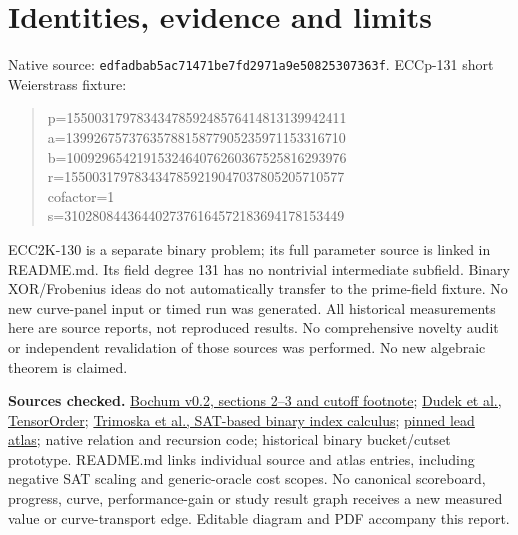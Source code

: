\documentclass[10pt]{article}
\begin{document}
\section*{Identities, evidence and limits}
\noindent Native source: \texttt{edfadbab5ac71471be7fd2971a9e50825307363f}.
ECCp-131 short Weierstrass fixture:
\begin{quote}\small\ttfamily
p=1550031797834347859248576414813139942411\\
a=1399267573763578815877905235971153316710\\
b=1009296542191532464076260367525816293976\\
r=1550031797834347859219047037805205710577\\
cofactor=1\\
s=3102808443644027376164572183694178153449
\end{quote}
\noindent ECC2K-130 is a separate binary problem; its full parameter source is
linked in README.md. Its field degree 131 has no nontrivial intermediate
subfield. Binary XOR/Frobenius ideas do not automatically transfer to the
prime-field fixture. No new curve-panel input or timed run was generated.
All historical measurements here are source reports, not reproduced results.
No comprehensive novelty audit or independent revalidation of those sources
was performed. No new algebraic theorem is claimed.

\medskip\noindent\textbf{Sources checked.}
\href{https://github.com/bochum-crypto/subexponential-ecdl/tree/1ee44e562b1b9a50ea339f3b8f81112b5a24b96f}{Bochum v0.2, sections 2--3 and cutoff footnote};
\href{https://arxiv.org/html/1908.04381v1}{Dudek et al., TensorOrder};
\href{https://pmc.ncbi.nlm.nih.gov/articles/PMC7334981/}{Trimoska et al., SAT-based binary index calculus};
\href{https://github.com/isogeny-labs/crypto-autoresearcher/tree/fc26d24369e56ad20995380475989c40a5e0e84f/knowledge/leads/ecdlp}{pinned lead atlas};
native relation and recursion code; historical binary bucket/cutset prototype.
README.md links individual source and atlas entries, including negative SAT
scaling and generic-oracle cost scopes. No canonical scoreboard, progress,
curve, performance-gain or study result graph receives a new measured value
or curve-transport edge. Editable diagram and PDF accompany this report.
\end{document}
